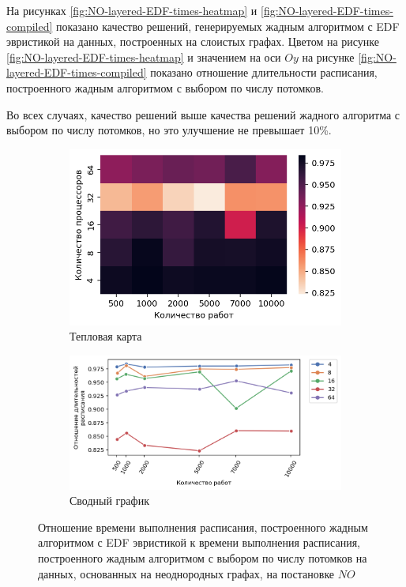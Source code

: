 На рисунках \ref{fig:NO-layered-EDF-times-heatmap} и \ref{fig:NO-layered-EDF-times-compiled} показано качество решений, генерируемых жадным алгоритмом с EDF эвристикой на данных, построенных на слоистых графах. Цветом на рисунке \ref{fig:NO-layered-EDF-times-heatmap} и значением на оси $Oy$ на рисунке \ref{fig:NO-layered-EDF-times-compiled} показано отношение длительности расписания, построенного жадным алгоритмом с выбором по числу потомков.

Во всех случаях, качество решений выше качества решений жадного алгоритма с выбором по числу потомков, но это улучшение не превышает 10\%.

\begin{figure}[!htbp]
    \centering
    \begin{subfigure}{0.49\textwidth}
        \includegraphics[width=\textwidth]{imgs/unbalanced/NO_EDF/times.png}
        \caption{Тепловая карта}
        \label{fig:NO-disbalanced-EDF-times-heatmap}
    \end{subfigure}
    \hfill
    \begin{subfigure}{0.49\textwidth}
        \includegraphics[width=\textwidth]{imgs/unbalanced/NO_EDF/gr_amalgamated.png}
        \caption{Сводный график}
        \label{fig:NO-disbalanced-EDF-times-compiled}
    \end{subfigure}
    \caption{Отношение времени выполнения расписания, построенного жадным алгоритмом с EDF эвристикой к времени выполнения расписания, построенного жадным алгоритмом с выбором по числу потомков на данных, основанных на неоднородных графах, на постановке $NO$}
\end{figure}

